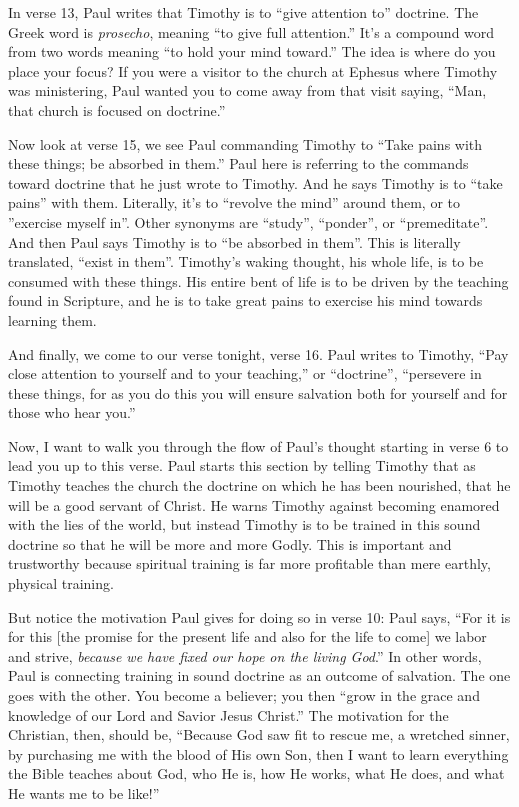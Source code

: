 \documentclass[letterpaper, 12pt]{article}
\begin{document}
    In verse 13, Paul writes that Timothy is to ``give attention to''
    doctrine. The Greek word is \emph{prosecho}, meaning ``to give full
    attention.'' It's a compound word from two words meaning ``to hold
    your mind toward.'' The idea is where do you place your focus? If
    you were a visitor to the church at Ephesus where Timothy was
    ministering, Paul wanted you to come away from that visit saying,
    ``Man, that church is focused on doctrine.''

    Now look at verse 15, we see Paul commanding Timothy to ``Take pains
    with these things; be absorbed in them.'' Paul here is referring to
    the commands toward doctrine that he just wrote to Timothy. And he
    says Timothy is to ``take pains'' with them. Literally, it's to
    ``revolve the mind'' around them, or to ''exercise myself in''.
    Other synonyms are ``study'', ``ponder'', or ``premeditate''. And
    then Paul says Timothy is to ``be absorbed in them''. This is
    literally translated, ``exist in them''. Timothy's waking thought,
    his whole life, is to be consumed with these things. His entire bent
    of life is to be driven by the teaching found in Scripture, and he
    is to take great pains to exercise his mind towards learning them.

    And finally, we come to our verse tonight, verse 16. Paul writes to
    Timothy, ``Pay close attention to yourself and to your teaching,''
    or ``doctrine'', ``persevere in these things, for as you do this you
    will ensure salvation both for yourself and for those who hear you.''

    Now, I want to walk you through the flow of Paul's thought starting
    in verse 6 to lead you up to this verse. Paul starts this section by
    telling Timothy that as Timothy teaches the church the doctrine on which he has
    been nourished, that he will be a good servant of Christ. He
    warns Timothy against becoming enamored with the lies of the world,
    but instead Timothy is to be trained in this sound doctrine so that
    he will be more and more Godly. This is important and trustworthy
    because spiritual training is far more profitable than mere earthly,
    physical training. 

    But notice the motivation Paul gives for doing so in verse 10: Paul
    says, ``For it is for this [the promise for the present life and
    also for the life to come] we labor and strive, \emph{because we
    have fixed our hope on the living God}.'' In other words, Paul is
    connecting training in sound doctrine as an outcome of salvation.
    The one goes with the other. You become a believer; you then ``grow
    in the grace and knowledge of our Lord and Savior Jesus Christ.''
    The motivation for the Christian, then, should be, ``Because God saw
    fit to rescue me, a wretched sinner, by purchasing me with the blood
    of His own Son, then I want to learn everything the Bible teaches
    about God, who He is, how He works, what He does, and what He wants
    me to be like!''
\end{document}
